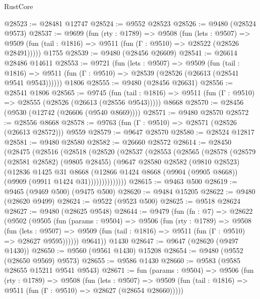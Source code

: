 \begin{lexlean}{RustCore}
\begin{coremodule}
@28523 := @28481 @12747
@28524 := @9552 @28523
@28526 := @9480 (@28524 @9573)
@28537 := @9699
    (fun (rty : @1789) =>
    @9508
      (fun (lets : @9507) =>
      @9509 (fun (tail : @1816) => @9511 (fun (Γ : @9510) => @28522 (@28526 @28491)))))
    @1755
@28539 := @9480 (@28456 @26609)
@28541 := @26614 @28486 @14611
@28553 := @9721
    (fun (lets : @9507) =>
    @9509
      (fun (tail : @1816) =>
      @9511 (fun (Γ : @9510) => @28539 (@28526 (@26613 (@28541 @9541 @9543))))))
    @1806
@28555 := @9480 (@28456 @26631)
@28556 := @28541 @1806
@28565 := @9745
    (fun (tail : @1816) => @9511 (fun (Γ : @9510) => @28555 (@28526 (@26613 (@28556 @9543)))))
    @8668
@28570 := @28456 (@9530 (@12742 (@26606 (@9540 @8669))))
@28571 := @9480 @28570
@28572 := @28556 @8668
@28578 := @9763 (fun (Γ : @9510) => @28571 (@28526 (@26613 @28572))) @9559
@28579 := @9647 @28570
@28580 := @28524 @12817
@28581 := @9480 @28580
@28582 := @26660 @28572
@28614 := @28450
    (@28475
      (@28516
        (@28518
          (@28520
            (@28537
              (@28553
                (@28565
                  (@28578
                    (@28579
                      (@28581 @28582)
                      (@9805 @28455)
                      (@9647
                        @28580
                        @28582
                        (@9810 @28523)
                        (@12836
                          @1425
                          @31
                          @8668
                          (@12866
                            @1424
                            @8668
                            (@9904 (@9905 @8668))
                            (@9909 (@9911 @1424 @31))))))))))))))
@28615 := @9463 @500
@28619 := @9465 (@9469 @500) (@9475 @500)
@28620 := @9484 @15205
@28622 := @9480 (@28620 @9499)
@28624 := @9522 (@9523 @500)
@28625 := @9518 @28624
@28627 := @9480 (@28625 @9548)
@28644 := @9479
    (fun (fn : @7) =>
    @28622
      (@9502
        (@9505
          (fun (params : @9504) =>
          @9506
            (fun (rty : @1789) =>
            @9508
              (fun (lets : @9507) =>
              @9509 (fun (tail : @1816) => @9511 (fun (Γ : @9510) => @28627 @9595))))))
        @9641))
    @1430
@28647 := @9647 (@28620 (@9497 @1430))
@28650 := @9560 (@9561 @1430) @15208
@28654 := @9480 (@9552 (@28650 @9569) @9573)
@28655 := @9586 @1430
@28660 := @9583 (@9585 @28655 @15211 @9541 @9543)
@28671 := fun (params : @9504) =>
  @9506
    (fun (rty : @1789) =>
    @9508
      (fun (lets : @9507) =>
      @9509 (fun (tail : @1816) => @9511 (fun (Γ : @9510) => @28627 (@28654 @28660)))))

\end{coremodule}
\end{lexlean}
